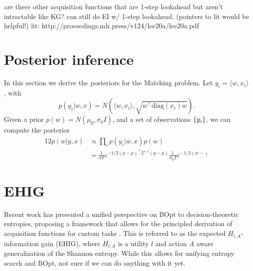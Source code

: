\documentclass[11pt]{article}
\begin{document}

are there other acquisition functions that are 1-step lookahead but aren't intractable like KG?
can still do EI w/ 1-step lookahead. (pointers to lit would be helpful!)
lit: http://proceedings.mlr.press/v124/lee20a/lee20a.pdf



\appendix

\section{Posterior inference}
In this section we derive the posteriors for the Matching problem.
Let $y_i = \langle w, x_i\rangle$, with
$$p(y_i|w,x) = N\left(\langle w,x_i\rangle, \sqrt{w^\top \text{diag}(x_i)w}\right).$$
Given a prior $p(w) = N(\mu_0, \sigma_0 I)$, and a set of observations $\left\{y_i\right\}$, we can compute the posterior
\begin{align*}12
p(w | y, x) &\propto \prod_i p(y_i | w,x) p(w)\\
&= \frac{1}{\sigma I} e^{-1/2(y-\mu)^\top \Sigma^{-1}(y-\mu)}
    \frac{1}{\sigma_0I} e^{-1/2 (w-)}
\end{align*}

\section{EHIG}
Recent work has presented a unified perspective on BOpt to decision-theoretic entropies, proposing a framework that allows for the principled derivation of acquisition functions for custom tasks \citep{neiswanger2022generalizing}.
This is referred to as the expected $H_{l,A}$-information gain (EHIG),
where $H_{l,A}$ is a utility $l$ and action $A$ aware generalization of the Shannon entropy.
While this allows for unifying entropy search and BOpt, not sure if we can do anything with it yet.
\end{document}
